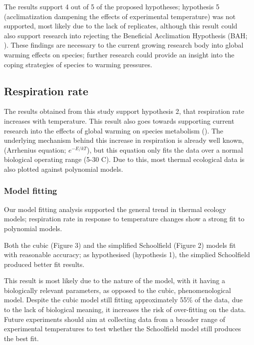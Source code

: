 \documentclass[../../Paper.tex]{subfiles}
\begin{document}
The results support 4 out of 5 of the proposed hypotheses; hypothesis 5 (acclimatization
dampening the effects of experimental temperature) was not supported, most likely due to the lack of replicates, 
although this result could also support research into rejecting the Beneficial Acclimation Hypothesis (BAH; \cite{leroi_temperature_1994}).
These findings are necessary to the current growing research body into global warming effects on species; 
further research could provide an insight into the coping strategies of species to warming pressures. 

\subsection*{Respiration rate}

The results obtained from this study support hypothesis 2, that respiration rate increases with 
temperature. This result also goes towards supporting current research into the effects of global warming
on species metabolism (\cite{grigaltchik_thermal_2012,sentis_using_2012}). The underlying mechanism behind this increase in respiration is already
well known, (Arrhenius equation; $e^{−E/kT}$), but this equation only fits the data over a normal biological operating range (5-30
\degree C). Due to this, most thermal ecological data is also plotted against polynomial models.

\subsubsection*{Model fitting}

Our model fitting analysis supported the general trend in thermal ecology models; respiration rate in
response to temperature changes show a strong fit to polynomial models. 

Both the cubic (Figure 3) and the simplified 
Schoolfield (Figure 2) models fit with reasonable accuracy; as hypothesised (hypothesis 1), the simplied 
Schoolfield produced better fit results. 

This result is most likely due to the nature of the model, with it having a biologically relevant parameters, as
opposed to the cubic, phenomenological model. Despite the cubic model still fitting approximately 
55\% of the data, due to the lack of biological meaning, it increases the risk of over-fitting 
on the data. Future experiments should aim at collecting data from a broader range of experimental temperatures
to test whether the Schoolfield model still produces the best fit. 
\end{document}
